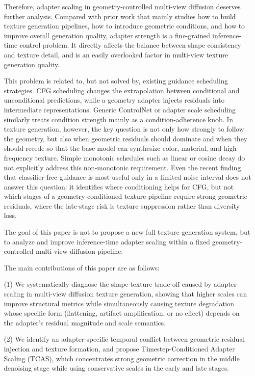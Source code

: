 \documentclass[times,twocolumn,final]{elsarticle}
\providecommand{\DIFadd}[1]{{\protect\color{blue} \sf #1}} %
\providecommand{\DIFaddbegin}{} %
\providecommand{\DIFaddend}{} %
\newcommand{\DIFaddincludegraphics}[2][]{{\color{blue}\fbox{\DIFOincludegraphics[#1]{#2}}}} %
\DeclareRobustCommand{\DIFaddbegin}{\DIFOaddbegin \let\includegraphics\DIFaddincludegraphics} %
\DeclareRobustCommand{\DIFaddend}{\DIFOaddend \let\includegraphics\DIFOincludegraphics} %
\begin{document}
Therefore, adapter scaling in geometry-controlled multi-view diffusion deserves further analysis. Compared with prior work that mainly studies how to build texture generation pipelines, how to introduce geometric conditions, and how to improve overall generation quality, adapter strength is a fine-grained inference-time control problem. It directly affects the balance between shape consistency and texture detail, and is an easily overlooked factor in multi-view texture generation quality.

This problem is related to, but not solved by, existing guidance scheduling strategies. CFG scheduling changes the extrapolation between conditional and unconditional predictions, while a geometry adapter injects residuals into intermediate representations. Generic ControlNet or adapter scale scheduling similarly treats condition strength mainly as a condition-adherence knob. In texture generation, however, the key question is not only how strongly to follow the geometry, but also when geometric residuals should dominate and when they should recede so that the base model can synthesize color, material, and high-frequency texture. Simple monotonic schedules such as linear or cosine decay do not explicitly address this non-monotonic requirement. \DIFaddbegin \DIFadd{Even the recent finding that classifier-free guidance is most useful only in a limited noise interval \cite{kynkanniemi2024limited} does not answer this question: it identifies where conditioning helps for CFG, but not which stages of a geometry-conditioned texture pipeline require strong geometric residuals, where the late-stage risk is texture suppression rather than diversity loss.
}\DIFaddend 

The goal of this paper is not to propose a new full texture generation system, but to analyze and improve inference-time adapter scaling within a fixed geometry-controlled multi-view diffusion pipeline.

The main contributions of this paper are as follows:

(1) We systematically diagnose the shape-texture trade-off caused by adapter scaling in multi-view diffusion texture generation, showing that higher scales can improve structural metrics while simultaneously causing texture degradation whose specific form (flattening, artifact amplification, or no effect) depends on the adapter's residual magnitude and scale semantics.

(2) We identify an adapter-specific temporal conflict between geometric residual injection and texture formation, and propose Timestep-Conditioned Adapter Scaling (TCAS), which concentrates strong geometric correction in the middle denoising stage while using conservative scales in the early and late stages.
\end{document}
